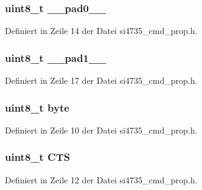\subsubsection[{\+\_\+\+\_\+pad0\+\_\+\+\_\+}]{\setlength{\rightskip}{0pt plus 5cm}uint8\+\_\+t \+\_\+\+\_\+pad0\+\_\+\+\_\+}\label{unionint__status_a8b4eebe79ded0459acec2f4950102ba3}


Definiert in Zeile 14 der Datei si4735\+\_\+cmd\+\_\+prop.\+h.

\hypertarget{unionint__status_a77f12d2e278bd5c07712648ac0df5e08}{}
\subsubsection[{\+\_\+\+\_\+pad1\+\_\+\+\_\+}]{\setlength{\rightskip}{0pt plus 5cm}uint8\+\_\+t \+\_\+\+\_\+pad1\+\_\+\+\_\+}\label{unionint__status_a77f12d2e278bd5c07712648ac0df5e08}


Definiert in Zeile 17 der Datei si4735\+\_\+cmd\+\_\+prop.\+h.

\hypertarget{unionint__status_a96f44d20f1dbf1c8785a7bc99a46164c}{}
\subsubsection[{byte}]{\setlength{\rightskip}{0pt plus 5cm}uint8\+\_\+t byte}\label{unionint__status_a96f44d20f1dbf1c8785a7bc99a46164c}


Definiert in Zeile 10 der Datei si4735\+\_\+cmd\+\_\+prop.\+h.

\hypertarget{unionint__status_a7f1760325354f291b9a0190e7e355ca8}{}
\subsubsection[{C\+T\+S}]{\setlength{\rightskip}{0pt plus 5cm}uint8\+\_\+t C\+T\+S}\label{unionint__status_a7f1760325354f291b9a0190e7e355ca8}


Definiert in Zeile 12 der Datei si4735\+\_\+cmd\+\_\+prop.\+h.

\hypertarget{unionint__status_afb74dff3cfacd68c02883e5282ef2f59}{}
